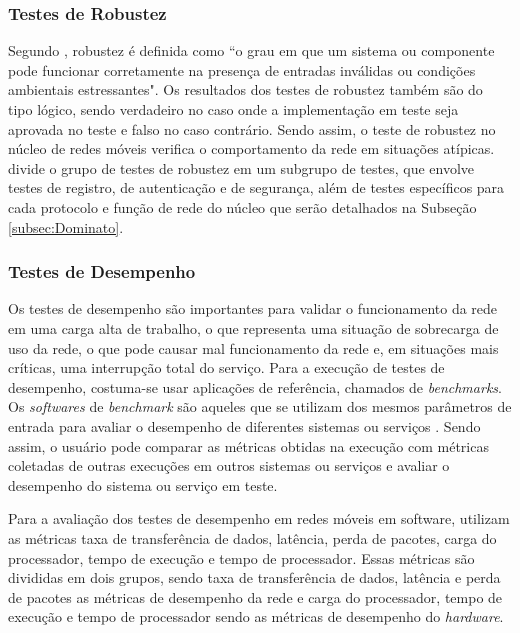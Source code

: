 \subsubsection{Testes de Robustez}

Segundo \cite[p.~64, tradução nossa]{IEEE.Standard.Glossary}, robustez é definida como ``o grau em que um sistema ou componente pode funcionar corretamente na presença de entradas inválidas ou condições ambientais estressantes".
Os resultados dos testes de robustez também são do tipo lógico, sendo verdadeiro no caso onde a implementação em teste seja aprovada no teste e falso no caso contrário.
Sendo assim, o teste de robustez no núcleo de redes móveis verifica o comportamento da rede em situações atípicas. \cite{Dominato2021} divide o grupo de testes de robustez em um subgrupo de testes, que envolve testes de registro, de autenticação e de segurança, além de testes específicos para cada protocolo e função de rede do núcleo que serão detalhados na Subseção \ref{subsec:Dominato}.

\subsubsection{Testes de Desempenho}

Os testes de desempenho são importantes para validar o funcionamento da rede em uma carga alta de trabalho, o que representa uma situação de sobrecarga de uso da rede, o que pode causar mal funcionamento da rede e, em situações mais críticas, uma interrupção total do serviço.
Para a execução de testes de desempenho, costuma-se usar aplicações de referência, chamados de \textit{benchmarks}.
Os \textit{softwares} de \textit{benchmark} são aqueles que se utilizam dos mesmos parâmetros de entrada para avaliar o desempenho de diferentes sistemas ou serviços \cite{Boano2018}.
Sendo assim, o usuário pode comparar as métricas obtidas na execução com métricas coletadas de outras execuções em outros sistemas ou serviços e avaliar o desempenho do sistema ou serviço em teste.

Para a avaliação dos testes de desempenho em redes móveis em software, \cite{Lee2021} utilizam as métricas taxa de transferência de dados, latência, perda de pacotes, carga do processador, tempo de execução e tempo de processador.
Essas métricas são divididas em dois grupos, sendo taxa de transferência de dados, latência e perda de pacotes as métricas de desempenho da rede e carga do processador, tempo de execução e tempo de processador sendo as métricas de desempenho do \textit{hardware}.

